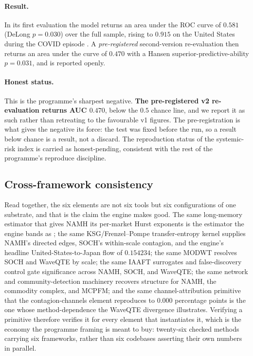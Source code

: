 \paragraph{Result.} In its first evaluation the model returns an area under the
ROC curve of $0.581$ (DeLong $p=0.030$) over the full sample, rising to $0.915$
on the United States during the COVID episode \citep{bhandari2025mcpfm}. A
\emph{pre-registered} second-version re-evaluation then returns an area under the
curve of $0.470$ with a Hansen superior-predictive-ability $p=0.031$, and is
reported openly.

\paragraph{Honest status.} This is the programme's sharpest negative.
\textbf{The pre-registered v2 re-evaluation returns AUC $0.470$}, below the $0.5$
chance line, and we report it as such rather than retreating to the favourable v1
figures. The pre-registration is what gives the negative its force: the test was
fixed before the run, so a result below chance is a result, not a discard. The
reproduction status of the systemic-risk index is carried as honest-pending,
consistent with the rest of the programme's reproduce discipline.

\subsection{Cross-framework consistency}
\label{sec:elem-consistency}

Read together, the six elements are not six tools but six configurations of one
substrate, and that is the claim the engine makes good. The same long-memory
estimator that gives NAMH its per-market Hurst exponents is the estimator the
engine bands as ; the same KSG/Frenzel--Pompe transfer-entropy
kernel supplies NAMH's directed edges, SOCH's within-scale contagion, and the
engine's headline United-States-to-Japan flow of $0.154234$; the same MODWT
resolves SOCH and WaveQTE by scale; the same IAAFT surrogates and false-discovery
control gate significance across NAMH, SOCH, and WaveQTE; the same network and
community-detection machinery recovers structure for NAMH, the commodity complex,
and MCPFM; and the same channel-attribution primitive that the contagion-channels
element reproduces to $0.000$ percentage points is the one whose method-dependence
the WaveQTE divergence illustrates. Verifying a primitive therefore verifies it
for every element that instantiates it, which is the economy the programme
framing is meant to buy: twenty-six checked methods carrying six frameworks,
rather than six codebases asserting their own numbers in parallel.

